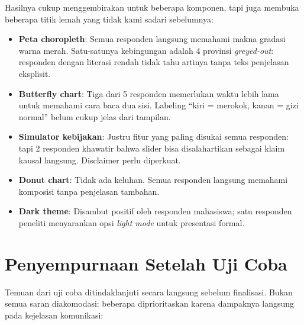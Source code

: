 Hasilnya cukup menggembirakan untuk beberapa komponen, tapi juga membuka beberapa titik lemah yang tidak kami sadari sebelumnya:

\begin{itemize}
  \item \textbf{Peta choropleth}: Semua responden langsung memahami makna gradasi warna merah. Satu-satunya kebingungan adalah 4 provinsi \textit{greyed-out}: responden dengan literasi rendah tidak tahu artinya tanpa teks penjelasan eksplisit.
  \item \textbf{Butterfly chart}: Tiga dari 5 responden memerlukan waktu lebih lama untuk memahami cara baca dua sisi. Labeling ``kiri = merokok, kanan = gizi normal'' belum cukup jelas dari tampilan.
  \item \textbf{Simulator kebijakan}: Justru fitur yang paling disukai semua responden: tapi 2 responden khawatir bahwa slider bisa disalahartikan sebagai klaim kausal langsung. Disclaimer perlu diperkuat.
  \item \textbf{Donut chart}: Tidak ada keluhan. Semua responden langsung memahami komposisi tanpa penjelasan tambahan.
  \item \textbf{Dark theme}: Disambut positif oleh responden mahasiswa; satu responden peneliti menyarankan opsi \textit{light mode} untuk presentasi formal.
\end{itemize}

\section{Penyempurnaan Setelah Uji Coba}

Temuan dari uji coba ditindaklanjuti secara langsung sebelum finalisasi. Bukan semua saran diakomodasi: beberapa diprioritaskan karena dampaknya langsung pada kejelasan komunikasi:

